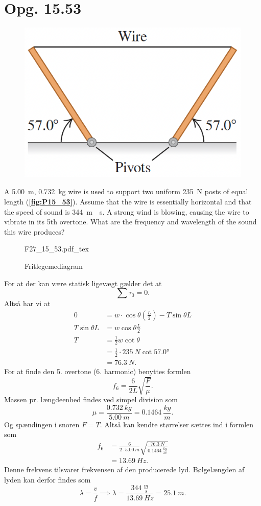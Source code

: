 \documentclass[12pt]{article}
\newcommand{\incfig}[2][1]{%
  \def\svgwidth{#1\columnwidth}
  {#2.pdf_tex}
}
\theoremstyle{definition}
\begin{document}
\section*{Opg. 15.53}
\begin{figure} [ht]
  \centering
  \caption{}
  \includegraphics[width=0.5\linewidth]{../figures/P15_53.png}
  \label{fig:P15_53}
\end{figure}

A \qty{5,00}{m}, \qty{0,732}{kg} wire is used to support two uniform \qty{235}{N} posts of equal length (\textbf{\autoref{fig:P15_53}}). Assume that the wire is essentially horizontal and that the speed of sound is \qty{344}{m \per s}. A strong wind is blowing, causing the wire to vibrate in its 5th overtone. What are the frequency and wavelength of the sound this wire produces?

\begin{figure}[ht]
  \centering
  \incfig[0.25]{F27_15_53}
  \caption{Fritlegemediagram}
  \label{fig:F27_15_53}
\end{figure}
\bigbreak
For at der kan være statisk ligevægt gælder det at
\[ 
  \sum \tau_{0} = 0
.\]
Altså har vi at
\begin{align*}
  0 &= w \cdot \cos \theta \left( \frac{L}{2} \right) - T \sin \theta L \\
  T \sin \theta L &= w \cos \theta \frac{L}{2} \\
  T &= \frac{1}{2} w \cot \theta \\
    &= \frac{1}{2} \cdot \qty{235}{N} \cot \ang{57,0} \\
    &= \qty{76,3}{N} 
.\end{align*}
For at finde den 5. overtone (6. harmonic) benyttes formlen
\[ 
f_6 = \frac{6}{2L} \sqrt{\frac{F}{\mu}}
.\]
Massen pr. længdeenhed findes ved simpel division som
\[ 
\mu = \frac{\qty{0,732}{kg}}{\qty{5,00}{m}} = \qty{0,1464}{\frac{kg}{m}} 
.\]
Og spændingen i snoren $F = T$. Altså kan kendte størrelser sættes ind i formlen som
\begin{align*}
  f_6 &= \frac{6}{2\cdot \qty{5,00}{m}} \sqrt{\frac{\qty{76,3}{N}}{\qty{0,1464}{\frac{kg}{m}} }} \\
      &= \qty{13,69}{Hz}
.\end{align*}
Denne frekvens tilsvarer frekvensen af den producerede lyd. Bølgelængden af lyden kan derfor findes som
\[ 
\lambda = \frac{v}{f} \implies \lambda = \frac{\qty{344}{\frac{m}{s}}}{\qty{13,69}{Hz}} = \qty{25,1}{m} 
.\]
\end{document}
